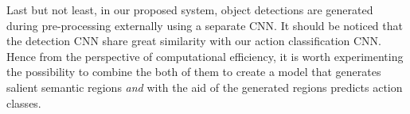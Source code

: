 Last but not least, in our proposed system, object detections are generated during pre-processing externally using a separate CNN. 
It should be noticed that the detection CNN share great similarity with our action classification CNN.
Hence from the perspective of computational efficiency, it is worth experimenting the possibility to combine the both of them to create a model that generates salient semantic regions \textit{and} with the aid of the generated regions predicts action classes.